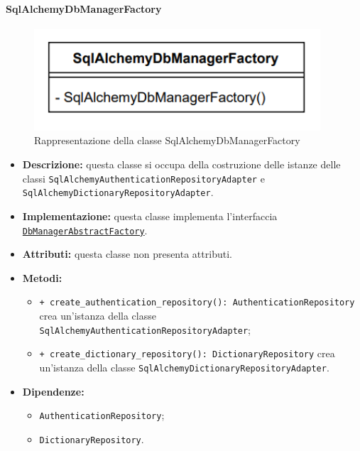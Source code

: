 \paragraph{SqlAlchemyDbManagerFactory} \label{SqlAlchemyDbManagerFactory}
\begin{figure}[H]
    \centering
    \includegraphics[width=0.95\textwidth]{assets/Backend/sql_alchemy_db_manager_factory.png}
    \caption{Rappresentazione della classe SqlAlchemyDbManagerFactory}
  \end{figure}
\begin{itemize}
    \item \textbf{Descrizione:} questa classe si occupa della costruzione delle istanze delle classi \texttt{SqlAlchemyAuthenticationRepositoryAdapter} e \texttt{SqlAlchemyDictionaryRepositoryAdapter}.
    \item \textbf{Implementazione:} questa classe implementa l'interfaccia \hyperref[DbManagerAbstractFactory]{\texttt{DbManagerAbstractFactory}}.
    \item \textbf{Attributi:} questa classe non presenta attributi.
    \item \textbf{Metodi:}
    \begin{itemize}
        \item \texttt{+ create\_authentication\_repository(): AuthenticationRepository} crea un'istanza della classe \texttt{SqlAlchemyAuthenticationRepositoryAdapter};
        \item \texttt{+ create\_dictionary\_repository(): DictionaryRepository} crea un'istanza della classe \texttt{SqlAlchemyDictionaryRepositoryAdapter}.
    \end{itemize}
    \item \textbf{Dipendenze:}
    \begin{itemize}
        \item \texttt{AuthenticationRepository};
        \item \texttt{DictionaryRepository}.
    \end{itemize}
\end{itemize}

